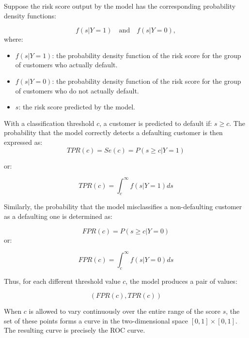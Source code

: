 \vspace{1.5em}

Suppose the risk score output by the model has the corresponding probability density functions:

$$f(s|Y=1) \quad \text{and} \quad f(s|Y=0),$$
where:
\begin{itemize}
    \item $f(s|Y=1)$: the probability density function of the risk score for the group of customers who actually default.
    \item $f(s|Y=0)$: the probability density function of the risk score for the group of customers who do not actually default.
    \item $s$: the risk score predicted by the model.
    
\end{itemize}


\vspace{1.5em}
With a classification threshold $c$, a customer is predicted to default if: $s\geq c$. The probability that the model correctly detects a defaulting customer is then expressed as:
\begin{equation}
    TPR(c)=Se(c)=P(s\geq c|Y=1)
\end{equation}

or:

\begin{equation}
    TPR(c)=\int_{c}^{\infty}f(s|Y=1)ds
\end{equation}

\vspace{1em}
\noindent
Similarly, the probability that the model misclassifies a non-defaulting customer as a defaulting one is determined as:

\begin{equation}
    FPR(c)=P(s\geq c|Y=0)
\end{equation}
or:

\begin{equation}
    FPR(c)=\int_{c}^{\infty}f(s|Y=0)ds
\end{equation}

\noindent
Thus, for each different threshold value $c$, the model produces a pair of values:

$$(FPR(c),TPR(c))$$

\vspace{1em}
When $c$ is allowed to vary continuously over the entire range of the score $s$, the set of these points forms a curve in the two-dimensional space $[0,1]\times[0,1]$. The resulting curve is precisely the ROC curve.

